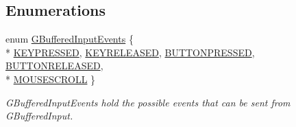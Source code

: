\subsection*{Enumerations}
\begin{DoxyCompactItemize}
\item 
enum \hyperlink{namespaceGW_1_1SYSTEM_a309fd3a92512dd2bfa8065d99c0d7fcb}{G\+Buffered\+Input\+Events} \{ \\*
\hyperlink{namespaceGW_1_1SYSTEM_a309fd3a92512dd2bfa8065d99c0d7fcbaf8bb58b0791c2d5d33b224213327f960}{K\+E\+Y\+P\+R\+E\+S\+S\+ED}, 
\hyperlink{namespaceGW_1_1SYSTEM_a309fd3a92512dd2bfa8065d99c0d7fcbabb708a216e7e8ef33cc542e6def7a688}{K\+E\+Y\+R\+E\+L\+E\+A\+S\+ED}, 
\hyperlink{namespaceGW_1_1SYSTEM_a309fd3a92512dd2bfa8065d99c0d7fcba56314f1a5b4d09751ed354a45a3a78fb}{B\+U\+T\+T\+O\+N\+P\+R\+E\+S\+S\+ED}, 
\hyperlink{namespaceGW_1_1SYSTEM_a309fd3a92512dd2bfa8065d99c0d7fcba9f7d6e613de276b27e471cd30eac08de}{B\+U\+T\+T\+O\+N\+R\+E\+L\+E\+A\+S\+ED}, 
\\*
\hyperlink{namespaceGW_1_1SYSTEM_a309fd3a92512dd2bfa8065d99c0d7fcbae4066728a571d6456cf5def5742a92bf}{M\+O\+U\+S\+E\+S\+C\+R\+O\+LL}
 \}\begin{DoxyCompactList}\small\item\em G\+Buffered\+Input\+Events hold the possible events that can be sent from G\+Buffered\+Input. \end{DoxyCompactList}
\end{DoxyCompactItemize}
